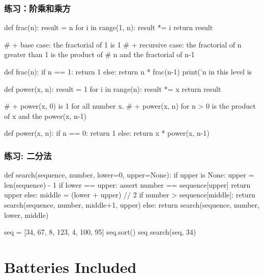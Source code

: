 \subsubsection{练习：阶乘和乘方}
\begin{python}
def frac(n):
    result = n
    for i in range(1, n):
        result *= i
    return result

# + base case: the fractorial of 1 is 1
# + recursive case: the fractorial of n greater than 1 is the product of
#  n and the fractorial of n-1

def frac(n):
    if n == 1:
        return 1
    else:
        return n * frac(n-1)
    print('n in this level is %

def power(x, n):
    result = 1
    for i in range(n):
        result *= x
    return result

# + power(x, 0) is 1 for all number x.
# + power(x, n) for n > 0 is the product of x and the power(x, n-1)

def power(x, n):
    if n == 0:
        return 1
    else:
        return x * power(x, n-1)
\end{python}

\subsubsection{练习: 二分法}
\begin{python}
def search(sequence, number, lower=0, upper=None):
    if upper is None:
        upper = len(sequence) - 1
    if lower == upper:
        assert number == sequence[upper]
        return upper
    else:
        middle = (lower + upper) // 2
        if number > sequence[middle]:
            return search(sequence, number, middle+1, upper)
        else:
            return search(sequence, number, lower, middle)

seq = [34, 67, 8, 123, 4, 100, 95]
seq.sort()
seq
search(seq, 34)
\end{python}

\section{Batteries Included}
